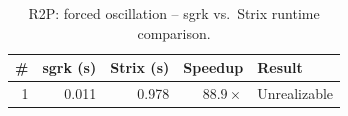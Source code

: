 \begin{table}[htbp]
\centering
\caption{R2P: forced oscillation -- sgrk vs.\ Strix runtime comparison.}
\label{tab:R2P_forced_oscillation}
\begin{tabular}{r r r r l}
\toprule
\# & sgrk (s) & Strix (s) & Speedup & Result \\
\midrule
1 & 0.011 & 0.978 & $88.9\times$ & Unrealizable \\
\bottomrule
\end{tabular}
\end{table}
